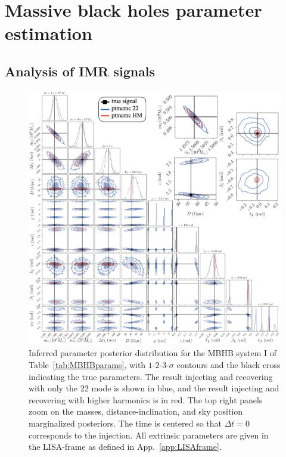 \documentclass[aps,showpacs,twocolumn,prd,superscriptaddress,nofootinbib]{revtex4-1}
\begin{document}

\section{Massive black holes parameter estimation}
\label{sec:SMBHPE}

\subsection{Analysis of IMR signals}
\label{subsec:SMBHPEfull}

\begin{figure}
  \centering
  \includegraphics[width=.98\linewidth]{corner_smbh_case0_ptmcmc_22_hm_withzoom.png}
  \caption{Inferred parameter posterior distribution for the MBHB system I of Table~\ref{tab:MBHBparams}, with $1$-$2$-$3$-$\sigma$ contours and the black cross indicating the true parameters. The result injecting and recovering with only the 22 mode is shown in blue, and the result injecting and recovering with higher harmonics is in red. The top right panels zoom on the masses, distance-inclination, and sky position marginalized posteriors. The time is centered so that $\Delta t=0$ corresponds to the injection. All extrinsic parameters are given in the LISA-frame as defined in App.~\ref{app:LISAframe}.}
  \label{fig:PEsmbh22hmCase0}
\end{figure}
\end{document}
